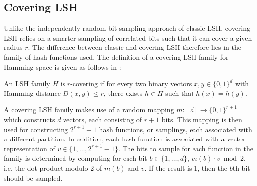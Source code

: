 \subsection{Covering LSH}
\label{background-covering-lsh}

Unlike the independently random bit sampling approach of classic LSH, covering LSH relies on a smarter sampling of correlated bits such that it can cover a given radius $r$. The difference between classic and covering LSH therefore lies in the family of hash functions used. The definition of a covering LSH family for Hamming space is given as follows in \cite{DBLP:journals/corr/PhamP16}:

\begin{definition}
\label{definition-covering-family}
  An LSH family $H$ is $r$-covering if for every two binary vectors $x, y \in \{0, 1\}^d$ with Hamming distance $D(x, y) \leq r$, there exists $h \in H$ such that $h(x) = h(y)$.
\end{definition}

A covering LSH family makes use of a random mapping $m \colon [d] \rightarrow \{0, 1\}^{r + 1}$ which constructs $d$ vectors, each consisting of $r + 1$ bits. This mapping is then used for constructing $2^{r + 1} - 1$ hash functions, or samplings, each associated with a different partition. In addition, each hash function is associated with a vector representation of $v \in \{1, \ldots, 2^{r + 1} - 1\}$. The bits to sample for each function in the family is determined by computing for each bit $b \in \{1, \ldots, d\}$, $m(b) \cdot v \bmod 2$, i.e. the dot product modulo 2 of $m(b)$ and $v$. If the result is 1, then the $b$th bit should be sampled.

